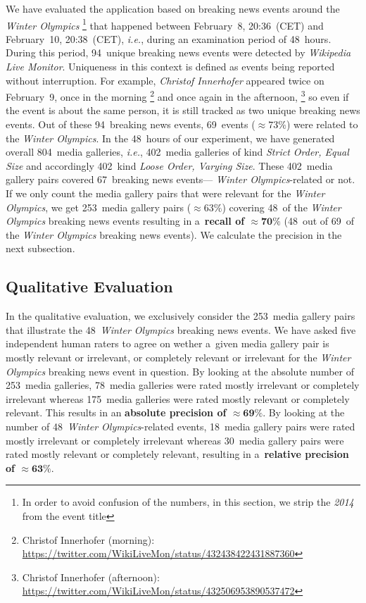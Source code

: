 \documentclass{sig-alternate}
\newcommand{\inlinelistingsize}{\fontsize{8pt}{11pt}}
\let\oldurl\url
\renewcommand{\url}[1]{\inlinelistingsize\oldurl{#1}}
\begin{document}
We have evaluated the application based on breaking news events
around the \emph{Winter Olympics}%
\footnote{In order to avoid confusion of the numbers,
in this section, we strip the \emph{2014} from the event title}
that happened between February~8, 20:36~(CET) and February~10, 20:38~(CET),
\emph{i.e.}, during an examination period of 48~hours.
During this period, 94~unique breaking news events
were detected by \emph{Wikipedia Live Monitor}.
Uniqueness in this context is defined as events being
reported without interruption.
For example, \emph{Christof Innerhofer} appeared twice on February~9,
once in the morning%
\footnote{Christof Innerhofer (morning):
\url{https://twitter.com/WikiLiveMon/status/432438422431887360}}
and once again in the afternoon,%
\footnote{Christof Innerhofer (afternoon):
\url{https://twitter.com/WikiLiveMon/status/432506953890537472}}
so even if the event is about the same person,
it is still tracked as two unique breaking news events.
Out of these 94~breaking news events,
69~events (${\approx}73\%$) were
related to the \emph{Winter Olympics}.
In the 48~hours of our experiment,
we have generated overall 804~media galleries,
\emph{i.e.}, 402~media galleries of kind \emph{Strict Order, Equal Size}
and accordingly 402~kind \emph{Loose Order, Varying Size}.
These 402~media gallery pairs covered 67~breaking news events---%
\emph{Winter Olympics}-related or not.
If we only count the media gallery pairs that were relevant
for the \emph{Winter Olympics},
we get 253~media gallery pairs (${\approx}63\%$)
covering 48~of the \emph{Winter Olympics} breaking news events
resulting in a~\textbf{recall of $\mathbf{{\approx}70\%}$}
(48~out of 69~of the \emph{Winter Olympics} breaking news events).
We calculate the precision in the next subsection.

\subsection{Qualitative Evaluation}

In the qualitative evaluation, we exclusively consider the 
253~media gallery pairs that illustrate the
48~\emph{Winter Olympics} breaking news events.
We have asked five independent human raters to agree on
wether a~given media gallery pair is mostly relevant or irrelevant,
or completely relevant or irrelevant for the 
\emph{Winter Olympics} breaking news event in question.
By looking at the absolute number of 253~media galleries,
78~media galleries were rated mostly irrelevant
or completely irrelevant
whereas 175~media galleries were rated mostly relevant
or completely relevant.
This results in an \textbf{absolute precision of $\mathbf{{\approx}69\%}$}.
By looking at the number of 48~\emph{Winter Olympics}-related events,
18~media gallery pairs were rated mostly irrelevant
or completely irrelevant
whereas 30~media gallery pairs were rated mostly relevant
or completely relevant, resulting in
a~\textbf{relative precision of $\mathbf{{\approx}63\%}$}.
\end{document}

